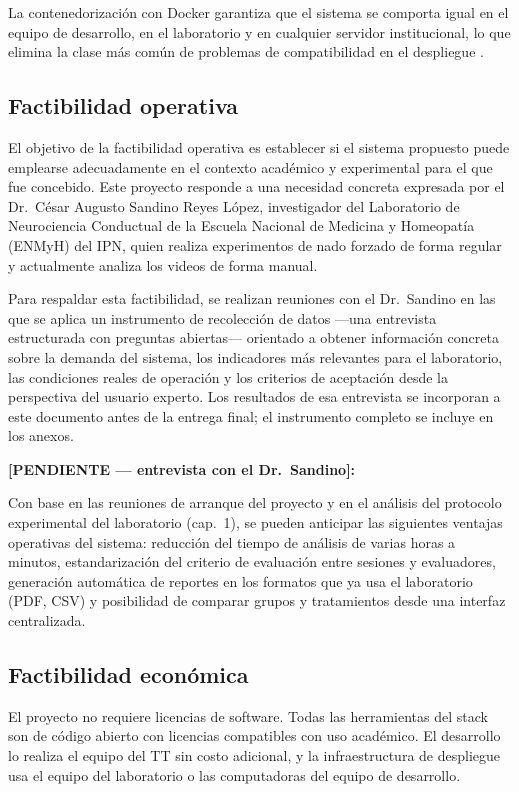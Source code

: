 La contenedorización con Docker garantiza que el sistema se comporta igual en el equipo
de desarrollo, en el laboratorio y en cualquier servidor institucional, lo que elimina
la clase más común de problemas de compatibilidad en el despliegue \cite{merkel2014}.

\subsection{Factibilidad operativa}

El objetivo de la factibilidad operativa es establecer si el sistema propuesto puede
emplearse adecuadamente en el contexto académico y experimental para el que fue
concebido. Este proyecto responde a una necesidad concreta expresada por el
Dr.\ César Augusto Sandino Reyes López, investigador del Laboratorio de Neurociencia
Conductual de la Escuela Nacional de Medicina y Homeopatía (ENMyH) del IPN, quien
realiza experimentos de nado forzado de forma regular y actualmente analiza los videos
de forma manual.

Para respaldar esta factibilidad, se realizan reuniones con el Dr.\ Sandino en las
que se aplica un instrumento de recolección de datos ---una entrevista estructurada
con preguntas abiertas--- orientado a obtener información concreta sobre la demanda
del sistema, los indicadores más relevantes para el laboratorio, las condiciones reales
de operación y los criterios de aceptación desde la perspectiva del usuario experto.
Los resultados de esa entrevista se incorporan a este documento antes de la entrega
final; el instrumento completo se incluye en los anexos.

\textbf{[PENDIENTE --- entrevista con el Dr.\ Sandino]:}

Con base en las reuniones de arranque del proyecto y en el análisis del protocolo
experimental del laboratorio (cap.~1), se pueden anticipar las siguientes ventajas
operativas del sistema: reducción del tiempo de análisis de varias horas a minutos,
estandarización del criterio de evaluación entre sesiones y evaluadores, generación
automática de reportes en los formatos que ya usa el laboratorio (PDF, CSV) y
posibilidad de comparar grupos y tratamientos desde una interfaz centralizada.

\subsection{Factibilidad económica}

El proyecto no requiere licencias de software. Todas las herramientas del stack son
de código abierto con licencias compatibles con uso académico. El desarrollo lo realiza
el equipo del TT sin costo adicional, y la infraestructura de despliegue usa el equipo
del laboratorio o las computadoras del equipo de desarrollo.

